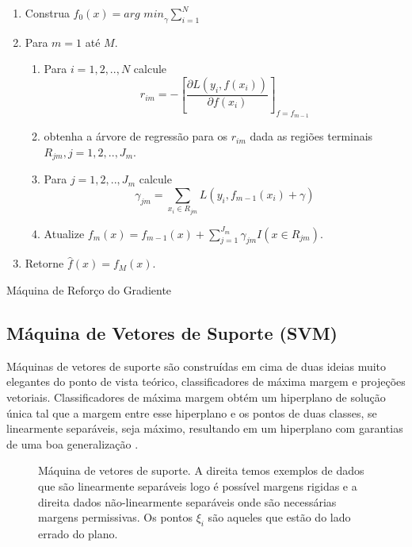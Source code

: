\begin{algorithm}[ht]
    \begin{enumerate}
        \item Construa $f_0(x) = \textit{arg min}_\gamma \sum_{i=1}^N$
        \item Para $m=1$ até $M$.
        \begin{enumerate}
            \item Para $i=1,2,..,N$ calcule
                \[ r_{im} = - \left[ \frac{\partial L(y_i,f(x_i))}{\partial
                f(x_i)} \right]_{f=f_{m-1}}\]
            \item obtenha a árvore de regressão para os $r_{im}$ dada as
                regiões terminais $R_{jm}, j=1,2,..,J_m$.
            \item Para $j=1,2,..,J_m$ calcule
                \[\gamma_{jm} = \sum_{x_i \in R_{jm}}
                L(y_i,f_{m-1}(x_i)+\gamma)\]
            \item Atualize $f_m(x) = f_{m-1}(x) +
                \sum_{j=1}^{J_m} \gamma_{jm}I(x \in R_{jm})$.
        \end{enumerate}
        \item Retorne $\hat{f}(x) = f_M(x)$.
    \end{enumerate}
    \caption{Máquina de Reforço do Gradiente}
    \label{algo:gbm}
\end{algorithm}


\subsection{Máquina de Vetores de Suporte (SVM)}
Máquinas de vetores de suporte são construídas em cima de duas ideias muito
elegantes do ponto de vista teórico, classificadores de máxima margem e
projeções vetoriais. Classificadores de máxima margem obtém um hiperplano de
solução única tal que a margem entre esse hiperplano e os pontos de duas
classes, se linearmente separáveis, seja máximo, resultando em um hiperplano
com garantias de uma boa generalização \cite{vapnik2013nature}.

\begin{figure}[ht]
   \centering
    \begin{subfigure}{.48\textwidth}
        \centering
        \def\svgwidth{\linewidth}
    \end{subfigure}
     \hfill
    \begin{subfigure}{.48\textwidth}
        \centering
        \def\svgwidth{\linewidth}
    \end{subfigure}
    \caption{Máquina de vetores de suporte. A direita temos exemplos de dados
    que são linearmente separáveis logo é possível margens rigidas e a direita
    dados não-linearmente separáveis onde são necessárias margens permissivas.
    Os pontos $\xi_i$ são aqueles que estão do lado errado do plano.}
    \label{fig:svm}
\end{figure}

